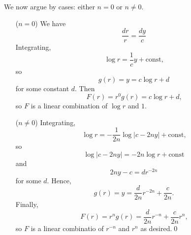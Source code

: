 \documentclass[oneside]{article}
\newcommand\abs[1]{\left|#1\right|}
\begin{document}
We now argue by cases: either $n = 0$ or $n \neq 0$.
\begin{itemize}[leftmargin=52pt]
\item[($n = 0$)] We have\[
  \frac{dr}{r} = \frac{dy}{c}
\] Integrating,\[
  \log r = \frac{1}{c}y + \mathrm{const}\text{,}
\] so \[
  g(r) = y = c \log r + d
\] for some constant $d$. Then \[
  F(r) = r^0g(r) = c \log r + d \text{,}
\]so $F$ is a linear combination of $\log r$ and $1$.

\item[($n \neq 0$)]
Integrating,\[
  \log r = -\frac{1}{2n}\log\abs{c-2ny} + \mathrm{const}\text{,}
\] so \[
   \log\abs{c-2ny} = -2n\log r + \mathrm{const}
\] and \[
  2ny - c = dr^{-2n}
\] for some $d$. Hence,
\[
  g(r) = y = \frac{d}{2n}r^{-2n} + \frac{c}{2n} \text{.}
\] Finally,\[
  F(r) = r^ng(r) = \frac{d}{2n}r^{-n} + \frac{c}{2n}r^n\text{,}
\] so $F$ is a linear combinatio of $r^{-n}$ and $r^n$ as desired.\qed
\end{itemize}
\end{document}

